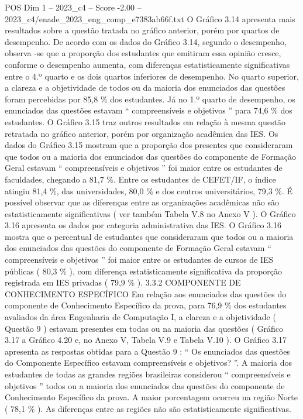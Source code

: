 \begin{textsample}{POS Dim 1 – 2023\_c4 – Score -2.00 – 2023\_c4/enade\_2023\_eng\_comp\_e7383ab66f.txt}
O Gráfico 3.14 apresenta mais resultados sobre a questão tratada no gráfico anterior, porém por quartos de desempenho.
De acordo com os dados do Gráfico 3.14, segundo o desempenho, observa -se que a proporção dos estudantes que emitiram essa opinião cresce, conforme o desempenho aumenta, com diferenças estatisticamente significativas entre o 4.º quarto e os dois quartos inferiores de desempenho.
No quarto superior, a clareza e a objetividade de todos ou da maioria dos enunciados das questões foram percebidas por 85,8 \% dos estudantes.
Já no 1.º quarto de desempenho, os enunciados das questões estavam “ compreensíveis e objetivos ” para 74,6 \% dos estudantes.
O Gráfico 3.15 traz outros resultados em relação à mesma questão retratada no gráfico anterior, porém por organização acadêmica das IES.
Os dados do Gráfico 3.15 mostram que a proporção dos presentes que consideraram que todos ou a maioria dos enunciados das questões do componente de Formação Geral estavam “ compreensíveis e objetivos ” foi maior entre os estudantes de faculdades, chegando a 81,7 \%.
Entre os estudantes de CEFET/IF, o índice atingiu 81,4 \%, das universidades, 80,0 \% e dos centros universitários, 79,3 \%.
É possível observar que as diferenças entre as organizações acadêmicas não são estatisticamente significativas ( ver também Tabela V.8 no Anexo V ).
O Gráfico 3.16 apresenta os dados por categoria administrativa das IES.
O Gráfico 3.16 mostra que o percentual de estudantes que consideraram que todos ou a maioria dos enunciados das questões do componente de Formação Geral estavam “ compreensíveis e objetivos ” foi maior entre os estudantes de cursos de IES públicas ( 80,3 \% ), com diferença estatisticamente significativa da proporção registrada em IES privadas ( 79,9 \% ). 3.3.2 COMPONENTE DE CONHECIMENTO ESPECÍFICO Em relação aos enunciados das questões do componente de Conhecimento Específico da prova, para 76,9 \% dos estudantes avaliados da área Engenharia de Computação I, a clareza e a objetividade ( Questão 9 ) estavam presentes em todas ou na maioria das questões ( Gráfico 3.17 a Gráfico 4.20 e, no Anexo V, Tabela V.9 e Tabela V.10 ).
O Gráfico 3.17 apresenta as respostas obtidas para a Questão 9 : “ Os enunciados das questões do Componente Específico estavam compreensíveis e objetivos? ”.
A maioria dos estudantes de todas as grandes regiões brasileiras considerou “ compreensíveis e objetivos ” todos ou a maioria dos enunciados das questões do componente de Conhecimento Específico da prova.
A maior porcentagem ocorreu na região Norte ( 78,1 \% ).
As diferenças entre as regiões não são estatisticamente significativas.

\end{textsample}
